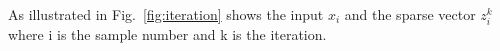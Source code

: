 \documentclass[authoryear,preprint,revi	ew,12pt]{elsarticle}
\begin{document}
As illustrated in Fig.~\ref{fig:iteration} shows the input $ x_i $ and the sparse vector $ z^k_i $ where i is the sample number and k is the iteration.

	
	
	
	
		
		
		
		
		
	
			

	
	


\end{document}
